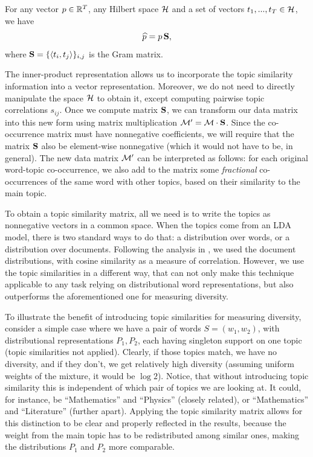 \ber
For any vector $p\in{\mathbb R}^T$, any Hilbert space ${\mathcal H}$ and a set of
vectors $t_1,...,t_T\in{\mathcal H}$, we have 
\[\widehat{p} = p\operatorname{\mathbf{S}},\]
where $\operatorname{\mathbf{S}}=\{\langle t_i,t_j\rangle\}_{i,j}$ is the Gram matrix.
\eer

The inner-product representation allows us to incorporate the topic
similarity information into a vector representation. Moreover, we do
not need to directly manipulate the space ${\mathcal H}$ to obtain it, except
computing pairwise topic correlations $s_{ij}$. Once we compute matrix
$\operatorname{\mathbf{S}}$, we can transform our data matrix into this new form using
matrix multiplication ${\mathcal M}'={\mathcal M}\cdot \operatorname{\mathbf{S}}$. Since the co-occurrence matrix
must have nonnegative coefficients, we will require that the matrix
$\operatorname{\mathbf{S}}$ also be element-wise nonnegative (which it would not
have to be, in general). The new data matrix ${\mathcal M}'$ can be interpreted
as follows: for each original word-topic co-occurrence, we also add to
the matrix some {\em fractional} co-occurrences of the same word with
other topics, based on their similarity to the main topic.

To obtain a topic similarity matrix, all we need is to write
the topics as nonnegative vectors in a common space. When the topics
come from an LDA model, there is two standard ways to do that: a
distribution over words, or a distribution over documents. Following
the analysis in \cite{bache:2013}, we used the document distributions,
with cosine similarity as a measure of correlation. However, we use the
topic similarities in a different way, that can not only make this
technique applicable to any task relying on distributional word
representations, but also outperforms the aforementioned one for
measuring diversity.

To illustrate the benefit of introducing topic similarities for
measuring diversity, consider a simple case where we have a pair of words
$S=(w_1,w_2)$, with distributional representations $P_1,P_2$, each having
singleton support on one topic (topic similarities not
applied). Clearly, if those topics match, we 
have no diversity, and if they don't, we get relatively high diversity
(assuming uniform weights of the mixture, it would be $\log 2$). Notice, that without introducing topic similarity this is
independent of which pair of topics we are looking at. It could, for
instance, be ``Mathematics'' and ``Physics'' (closely related), or
``Mathematics'' and ``Literature'' (further apart).  Applying the
topic similarity matrix allows for this distinction to be clear and properly
reflected in the results, because the weight from the main topic has
to be redistributed among similar ones, making the distributions $P_1$
and $P_2$ more comparable.
  

